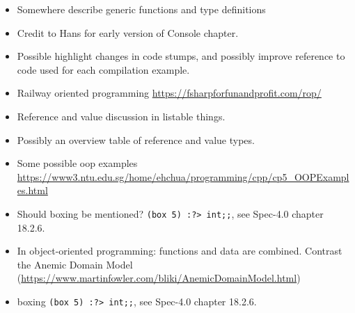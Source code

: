 \documentclass[fsharpNotes.tex]{subfiles}
\begin{document}
\begin{itemize}
\item Somewhere describe generic functions and type definitions
\item Credit to Hans for early version of Console chapter.
\item Possible highlight changes in code stumps, and possibly improve reference to code used for each compilation example.
\item Railway oriented programming \url{https://fsharpforfunandprofit.com/rop/}
\item Reference and value discussion in listable things.
\item Possibly an overview table of reference and value types.
\item Some possible oop examples \url{https://www3.ntu.edu.sg/home/ehchua/programming/cpp/cp5_OOPExamples.html}
\item Should boxing be mentioned? \lstinline|(box 5) :?> int;;|, see Spec-4.0 chapter 18.2.6.
\item In object-oriented programming: functions and data are combined. Contrast the Anemic Domain Model (\url{https://www.martinfowler.com/bliki/AnemicDomainModel.html})
\item boxing \lstinline|(box 5) :?> int;;|, see Spec-4.0 chapter 18.2.6.
\end{itemize}
\end{document}

